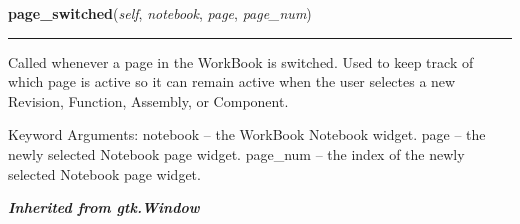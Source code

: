     \label{reliafree:notebook:WorkBookWindow:page_switched}

    \vspace{0.5ex}

\hspace{.8\funcindent}\begin{boxedminipage}{\funcwidth}

    \raggedright \textbf{page\_switched}(\textit{self}, \textit{notebook}, \textit{page}, \textit{page\_num})

    \vspace{-1.5ex}

    \rule{\textwidth}{0.5\fboxrule}
\setlength{\parskip}{2ex}
    Called whenever a page in the WorkBook is switched.  Used to keep track
    of which page is active so it can remain active when the user selectes 
    a new Revision, Function, Assembly, or Component.

    Keyword Arguments: notebook -- the WorkBook Notebook widget. page     
    -- the newly selected Notebook page widget. page\_num -- the index of 
    the newly selected Notebook page widget.

\setlength{\parskip}{1ex}
    \end{boxedminipage}


\large{\textbf{\textit{Inherited from gtk.Window}}}

